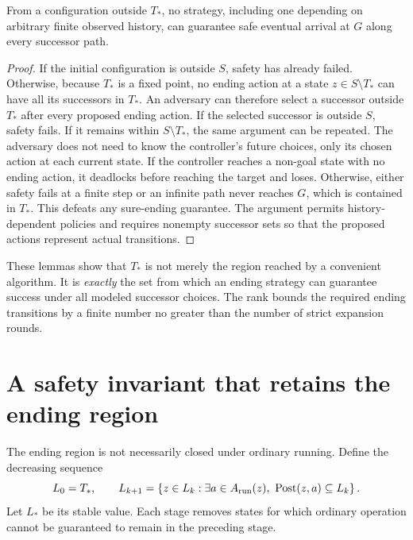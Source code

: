 \begin{lemma}\label{r:ending-complete}
From a configuration outside $T_*$, no strategy, including one depending on arbitrary finite observed history, can guarantee safe eventual arrival at $G$ along every successor path.
\end{lemma}
\begin{proof}
If the initial configuration is outside $S$, safety has already failed. Otherwise, because $T_*$ is a fixed point, no ending action at a state $z\in S\setminus T_*$ can have all its successors in $T_*$. An adversary can therefore select a successor outside $T_*$ after every proposed ending action. If the selected successor is outside $S$, safety fails. If it remains within $S\setminus T_*$, the same argument can be repeated. The adversary does not need to know the controller's future choices, only its chosen action at each current state. If the controller reaches a non-goal state with no ending action, it deadlocks before reaching the target and loses. Otherwise, either safety fails at a finite step or an infinite path never reaches $G$, which is contained in $T_*$. This defeats any sure-ending guarantee. The argument permits history-dependent policies and requires nonempty successor sets so that the proposed actions represent actual transitions.
\end{proof}

These lemmas show that $T_*$ is not merely the region reached by a convenient algorithm. It is \emph{exactly} the set from which an ending strategy can guarantee success under all modeled successor choices. The rank bounds the required ending transitions by a finite number no greater than the number of strict expansion rounds.

\section{A safety invariant that retains the ending region}
The ending region is not necessarily closed under ordinary running. Define the decreasing sequence
\[
L_0=T_*,\qquad
L_{k+1}=\left\{z\in L_k:\exists a\in A_{\rm run}(z),\ \operatorname{Post}(z,a)\subseteq L_k\right\}.
\]
Let $L_*$ be its stable value. Each stage removes states for which ordinary operation cannot be guaranteed to remain in the preceding stage.

